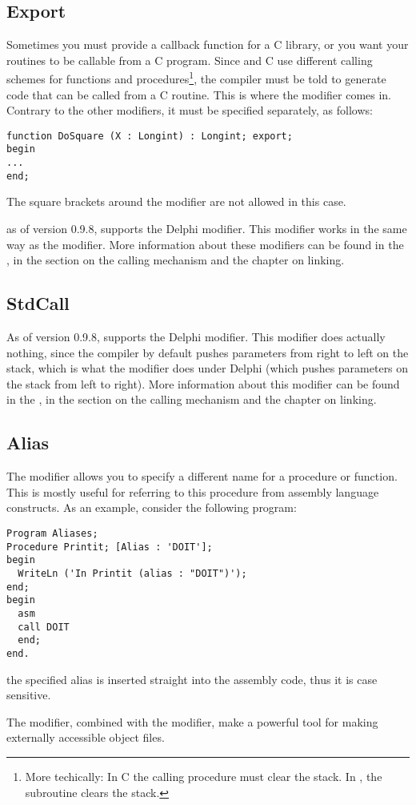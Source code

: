 \documentclass{report}
\begin{document}
\subsection{Export}
Sometimes you must provide a callback function for a C library, or you want
your routines to be callable from a C program. Since \fpc and C use
different calling schemes for functions and procedures\footnote{More
techically: In C the calling procedure must clear the stack. In \fpc, the
subroutine clears the stack.}, the compiler must be told to generate code
that can be called from a C routine. This is where the  modifier
comes in. Contrary to the other modifiers, it must be specified separately,
as follows:
\begin{verbatim}
function DoSquare (X : Longint) : Longint; export;
begin
...
end;
\end{verbatim}
The square brackets around the modifier are not allowed in this case.
\begin{remark}
as of version 0.9.8, \fpc supports the Delphi  modifier.
This modifier works in the same way as the  modifier.
More information about these modifiers can be found in the \progref, in the
section on the calling mechanism and the chapter on linking.
\end{remark}
\subsection{StdCall}
As of version 0.9.8, \fpc supports the Delphi  modifier.
This modifier does actually nothing, since the \fpc compiler by default
pushes parameters from right to left on the stack, which is what the
modifier does under Delphi (which pushes parameters on the stack from left to
right).
More information about this modifier can be found in the \progref, in the
section on the calling mechanism and the chapter on linking.
\subsection{Alias}
The  modifier allows you to specify a different name for a
procedure or function. This is mostly useful for referring to this procedure
from assembly language constructs. As an example, consider the following
program:
\begin{verbatim}
Program Aliases;
Procedure Printit; [Alias : 'DOIT'];
begin
  WriteLn ('In Printit (alias : "DOIT")');
end;
begin
  asm
  call DOIT
  end;
end.
\end{verbatim}
\begin{remark} the specified alias is inserted straight into the assembly
code, thus it is case sensitive.
\end{remark}
The  modifier, combined with the  modifier, make a
powerful tool for making externally accessible object files.
\end{document}
